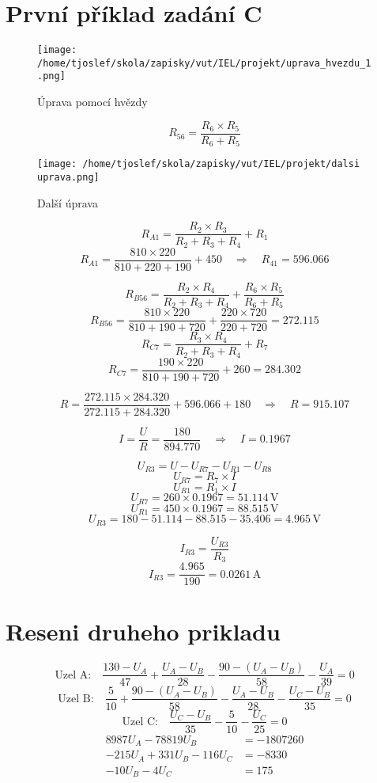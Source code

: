 \documentclass{article}
\begin{document}
\sloppy

\section{První příklad zadání C}

\begin{figure}[!ht]
  \centering
  \texttt{[image: /home/tjoslef/skola/zapisky/vut/IEL/projekt/uprava\_hvezdu\_1.png]}
  \caption{Úprava pomocí hvězdy}
  \label{fig:hvezda}
\end{figure}

\[
    R_{56} = \frac{R_6 \times R_5}{R_6 + R_5}
\]

\begin{figure}[!ht]
  \centering
  \texttt{[image: /home/tjoslef/skola/zapisky/vut/IEL/projekt/dalsi uprava.png]}
  \caption{Další úprava}
  \label{fig:dalsi_uprava}
\end{figure}

\[
R_{A1} = \frac{R_2 \times R_3}{R_2 + R_3 + R_4} + R_1
\]
\[
    R_{A1} = \frac{810 \times 220}{810 + 220 + 190} + 450 \quad \Rightarrow \quad R_{41} = 596.066
\]

\[
R_{B56} = \frac{R_2 \times R_4}{R_2 + R_3 + R_4} + \frac{R_6 \times R_5}{R_6 + R_5}
\]
\[
R_{B56} = \frac{810 \times 220}{810 + 190 + 720} + \frac{220 \times 720}{220 + 720}
= 272.115
\]
\[
R_{C7} = \frac{R_3 \times R_4}{R_2 + R_3 + R_4} + R_7
\]
\[
R_{C7} = \frac{190 \times 220}{810 + 190 + 720} + 260 = 284.302
\]

\[
R  = \frac{272.115 \times 284.320}{272.115 + 284.320} + 596.066 + 180 \quad \Rightarrow \quad R = 915.107
\]

\[
I = \frac{U}{R} = \frac{180}{894.770} \quad \Rightarrow \quad I = 0.1967
\]

\[
    U_{R3} = U - U_{R7} - U_{R1} - U_{R8}
\]
\[
U_{R7} = R_7 \times I
\]
\[
    U_{R1} = R_1 \times I
\]
\[
U_{R7} = 260 \times 0.1967 = 51.114 \, \text{V}
\]
\[
    U_{R1} = 450 \times 0.1967 = 88.515 \, \text{V}
\]
\[
U_{R3}  = 180 - 51.114 - 88.515 - 35.406  = 4.965 \, \text{V}
\]

\[
I_{R3} = \frac{U_{R3}}{R_3}
\]
\[
I_{R3} = \frac{4.965}{190} = 0.0261 \, \text{A}
\]

\clearpage
\section{Reseni druheho prikladu}
\[
    \text{Uzel A:} \quad \frac{130 - U_A}{47} + \frac{U_A - U_B}{28} - \frac{90 - (U_A - U_B)}{58} - \frac{U_A}{39} = 0
\]
\[
    \text{Uzel B:} \quad \frac{5}{10} + \frac{90 - (U_A - U_B)}{58} - \frac{U_A - U_B}{28} - \frac{U_C - U_B}{35} = 0
\]
\[
    \text{Uzel C:} \quad \frac{U_C - U_B}{35} - \frac{5}{10} - \frac{U_C}{25} = 0
\]
\begin{align*}
    8987U_A - 78819U_B &= -1807260 \\
    -215U_A + 331U_B - 116U_C &= -8330 \\
    -10U_B - 4U_C &= 175
\end{align*}
\end{document}
